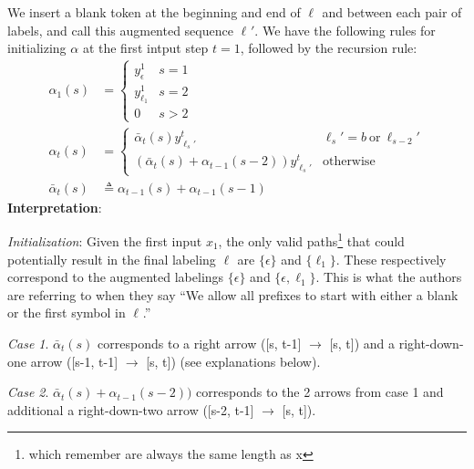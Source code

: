 \documentclass[11pt]{article}
\renewcommand\vec[2][]{\bm{#2}_{#1}}
\newcommand\p{\Needspace{10\baselineskip} \noindent}
\begin{document}
\p We insert a blank token at the beginning and end of $\vec\ell$ and between each pair of labels, and call this augmented sequence $\vec{\ell}'$. We have the following rules for initializing $\alpha$ at the first intput step $t{=}1$, followed by the recursion rule:
\begin{align}
	\alpha_1(s) &= \begin{cases}
			y_{\epsilon}^1 & s{=}1 \\
			y_{ \vec[1]{\ell} }^1 & s{=}2 \\
			0 & s > 2
	\end{cases}\\
	\alpha_t(s)
		&= \begin{cases}
			\bar{\alpha}_t(s) y_{\vec[s]{\ell}' }^t 	& \vec[s]{\ell}' {=} b ~ \text{or} ~ \vec[s-2]{\ell}'  \\
			( \bar{\alpha}_t(s) + \alpha_{t-1}(s -2) ) y_{\vec[s]{\ell}' }^t  							& \text{otherwise}
		\end{cases}\\
	\bar{\alpha}_t(s)
		&\triangleq \alpha_{t-1}(s) + \alpha_{t-1}(s - 1)
\end{align}
\textbf{Interpretation}:
\begin{compactitem}
	\item \textit{Initialization}: Given the first input $x_1$, the only valid paths\footnote{which remember are always the same length as x} that could potentially result in the final labeling $\vec\ell$ are $\{\epsilon \}$ and $\{\ell_1\}$.  These respectively correspond to the augmented labelings $\{\epsilon\}$ and $\{\epsilon, \ell_1\}$. This is what the authors are referring to when they say ``We allow all prefixes to start with either a blank or the first symbol in $\vec\ell$.''
	
	\item \textit{Case 1}. $\bar{\alpha}_t(s) $ corresponds to a right arrow ([s, t-1] $\rightarrow$ [s, t]) and a right-down-one arrow ([s-1, t-1] $\rightarrow$ [s, t]) (see explanations below). 
	
	\item \textit{Case 2}. $\bar{\alpha}_t(s) + \alpha_{t-1}(s -2) )$ corresponds to the 2 arrows from case 1 and additional a right-down-two arrow ([s-2, t-1] $\rightarrow$ [s, t]). 
\end{compactitem}
\end{document}
